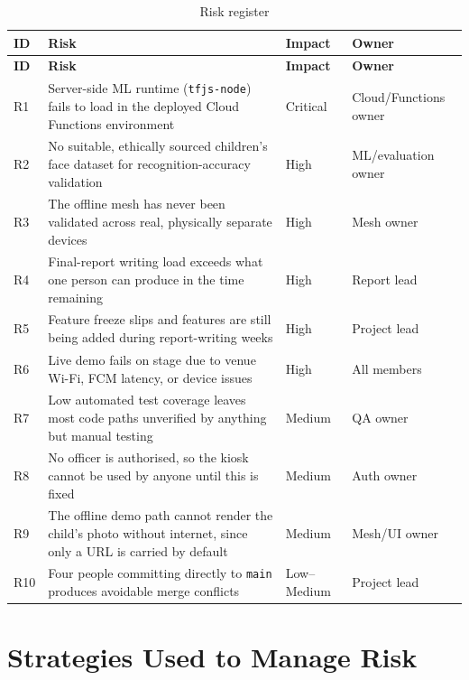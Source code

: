 \documentclass[12pt,a4paper,oneside]{report}
\newcommand{\code}[1]{\texttt{#1}}
\begin{document}
\begin{longtable}{|p{1.0cm}|p{5.3cm}|p{2.1cm}|p{4.7cm}|}
\caption{Risk register}
\label{tab:risk}\\
\hline
\textbf{ID} & \textbf{Risk} & \textbf{Impact} & \textbf{Owner} \\
\hline
\endfirsthead
\hline
\textbf{ID} & \textbf{Risk} & \textbf{Impact} & \textbf{Owner} \\
\hline
\endhead
R1  & Server-side ML runtime (\code{tfjs-node}) fails to load in the deployed Cloud Functions environment & Critical & Cloud/Functions owner \\ \hline
R2  & No suitable, ethically sourced children's face dataset for recognition-accuracy validation & High & ML/evaluation owner \\ \hline
R3  & The offline mesh has never been validated across real, physically separate devices & High & Mesh owner \\ \hline
R4  & Final-report writing load exceeds what one person can produce in the time remaining & High & Report lead \\ \hline
R5  & Feature freeze slips and features are still being added during report-writing weeks & High & Project lead \\ \hline
R6  & Live demo fails on stage due to venue Wi-Fi, FCM latency, or device issues & High & All members \\ \hline
R7  & Low automated test coverage leaves most code paths unverified by anything but manual testing & Medium & QA owner \\ \hline
R8  & No officer is authorised, so the kiosk cannot be used by anyone until this is fixed & Medium & Auth owner \\ \hline
R9  & The offline demo path cannot render the child's photo without internet, since only a URL is carried by default & Medium & Mesh/UI owner \\ \hline
R10 & Four people committing directly to \code{main} produces avoidable merge conflicts & Low--Medium & Project lead \\
\hline
\end{longtable}

\section{Strategies Used to Manage Risk}
\end{document}
